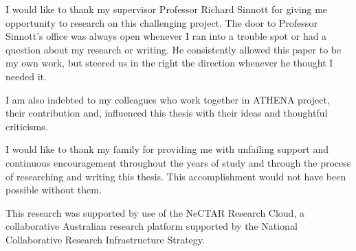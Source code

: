 \documentclass[
11pt, %
oneside, %
english, %
singlespacing, %
headsepline, %
chapterinoneline, %
consistentlayout, %
]{MastersDoctoralThesis} %
\begin{document}
\begin{acknowledgements}
\addchaptertocentry{\acknowledgementname} %

I would like to thank my supervisor Professor Richard Sinnott for giving me opportunity to research on this challenging project. The door to Professor Sinnott's office was always open whenever I ran into a trouble spot or had a question about my research or writing. He consistently allowed this paper to be my own work, but steered us in the right the direction whenever he thought I needed it.

I am also indebted to my colleagues who work together in ATHENA project, their contribution and, influenced this thesis with their ideas and thoughtful criticisms.

I would like to thank my family for providing me with unfailing support and continuous encouragement throughout the years of study and through the process of researching and writing this thesis. This accomplishment would not have been possible without them.

This research was supported by use of the NeCTAR Research Cloud, a collaborative Australian research platform supported by the National Collaborative Research Infrastructure Strategy.


\end{acknowledgements}


\tableofcontents %





\end{document}
